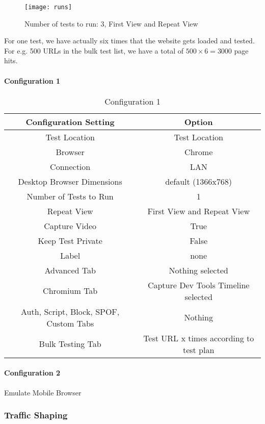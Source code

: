 \begin{figure}[h!]
  \caption{Number of tests to run: 3, First View and Repeat View}
  \texttt{[image: runs]}
\end{figure}

For one test, we have actually six times that the website gets loaded and tested.
For e.g. 500 URLs in the bulk test list, we have a total of $500 \times 6 = 3000$ page hits.


\paragraph{Configuration 1}

\begin{table}[h]
	\caption[Test Runs]{Configuration 1}
	\label{tab:tamodelleVergleich}
	\centering
	\begin{tabular}{ |c|c| } 
	\hline
	Configuration Setting & Option \\
	\hline
	Test Location & Test Location \\ 
	Browser & Chrome \\
	\hline
	Connection & LAN \\
	Desktop Browser Dimensions & default (1366x768) \\
	Number of Tests to Run & 1 \\
	Repeat View & First View and Repeat View \\
	Capture Video & True \\
	Keep Test Private & False \\
	Label & none \\
	\hline	  
	Advanced Tab & Nothing selected \\
	Chromium Tab & Capture Dev Tools Timeline selected  \\
	Auth, Script, Block, SPOF, Custom Tabs & Nothing  \\
	Bulk Testing Tab & Test URL x times according to test plan \\
	\hline
	\end{tabular}
\end{table}

\paragraph{Configuration 2}

Emulate Mobile Browser



\subsubsection{Traffic Shaping}


